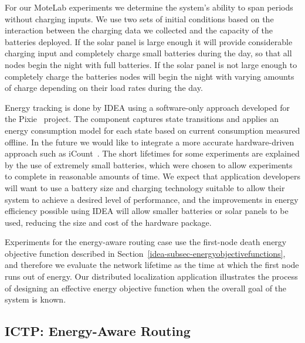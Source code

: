 For our MoteLab experiments we determine the system's ability to span periods
without charging inputs. We use two sets of initial conditions based on the
interaction between the charging data we collected and the capacity of the
batteries deployed. If the solar panel is large enough it will provide
considerable charging input and completely charge small batteries during the
day, so that all nodes begin the night with full batteries. If the solar
panel is not large enough to completely charge the batteries nodes will begin
the night with varying amounts of charge depending on their load rates during
the day.

Energy tracking is done by IDEA using a software-only approach developed for
the Pixie~\cite{pixie-sensys08} project. The component captures state
transitions and applies an energy consumption model for each state based on
current consumption measured offline. In the future we would like to
integrate a more accurate hardware-driven approach such as
iCount~\cite{icount-spots08}. The short lifetimes for some experiments are
explained by the use of extremely small batteries, which were chosen to allow
experiments to complete in reasonable amounts of time. We expect that
application developers will want to use a battery size and charging
technology suitable to allow their system to achieve a desired level of
performance, and the improvements in energy efficiency possible using IDEA
will allow smaller batteries or solar panels to be used, reducing the size
and cost of the hardware package.

Experiments for the energy-aware routing case use the first-node death energy
objective function described in
Section~\ref{idea-subsec-energyobjectivefunctions}, and therefore we evaluate
the network lifetime as the time at which the first node runs out of energy.
Our distributed localization application illustrates the process of designing
an effective energy objective function when the overall goal of the system is
known.

\subsection{ICTP: Energy-Aware Routing}


